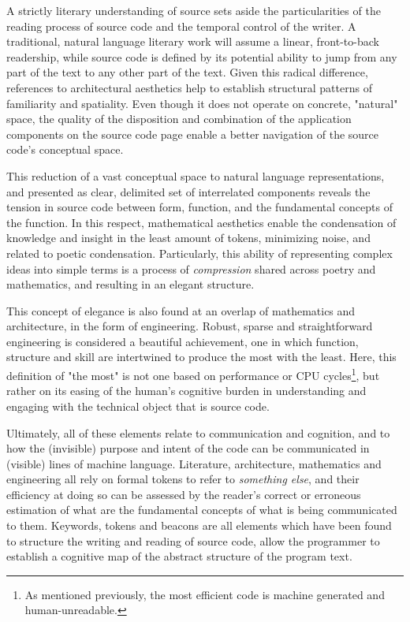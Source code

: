 A strictly literary understanding of source sets aside the particularities of the reading process of source code and the temporal control of the writer. A traditional, natural language literary work will assume a linear, front-to-back readership, while source code is defined by its potential ability to jump from any part of the text to any other part of the text. Given this radical difference, references to architectural aesthetics help to establish structural patterns of familiarity and spatiality. Even though it does not operate on concrete, "natural" space, the quality of the disposition and combination of the application components on the source code page enable a better navigation of the source code's conceptual space.

This reduction of a vast conceptual space to natural language representations, and presented as clear, delimited set of interrelated components  reveals the tension in source code between form, function, and the fundamental concepts of the function. In this respect, mathematical aesthetics enable the condensation of knowledge and insight in the least amount of tokens, minimizing noise, and related to poetic condensation. Particularly, this ability of representing complex ideas into simple terms is a process of \emph{compression} shared across poetry and mathematics, and resulting in an elegant structure.

This concept of elegance is also found at an overlap of mathematics and architecture, in the form of engineering. Robust, sparse and straightforward engineering is considered a beautiful achievement, one in which function, structure and skill are intertwined to produce the most with the least. Here, this definition of "the most" is not one based on performance or CPU cycles\footnote{As mentioned previously, the most efficient code is machine generated and human-unreadable.}, but rather on its easing of the human's cognitive burden in understanding and engaging with the technical object that is source code.

Ultimately, all of these elements relate to communication and cognition, and to how the (invisible) purpose and intent of the code can be communicated in (visible) lines of machine language. Literature, architecture, mathematics and engineering all rely on formal tokens to refer to \emph{something else}, and their efficiency at doing so can be assessed by the reader's correct or erroneous estimation of what are the fundamental concepts of what is being communicated to them. Keywords, tokens and beacons are all elements which have been found to structure the writing and reading of source code, allow the programmer to establish a cognitive map of the abstract structure of the program text.

